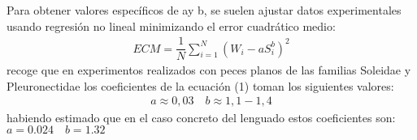 \documentclass[a4paper,10pt,spanish]{jupyterBook}
\begin{document}
\sphinxAtStartPar
Para obtener valores específicos de ay b, se suelen ajustar datos experimentales usando regresión no lineal minimizando el error cuadrático medio:
\begin{equation}\label{equation:content/03/Coeficientes:eq_ECM}
\begin{split}ECM=\dfrac{1}{N}\sum_{i=1}^N(W_i-aS_i^b)^2\end{split}
\end{equation}
\sphinxAtStartPar
{} recoge que en experimentos realizados con peces planos de las familias Soleidae y Pleuronectidae los coeficientes de la ecuación (1) toman los siguientes valores:
\begin{equation*}
\begin{split}a\approx0,03\quad b\approx1,1-1,4\end{split}
\end{equation*}
\sphinxAtStartPar
habiendo estimado que en el caso concreto del lenguado estos coeficientes son: \(a=0.024\quad b=1.32\)
\end{document}
